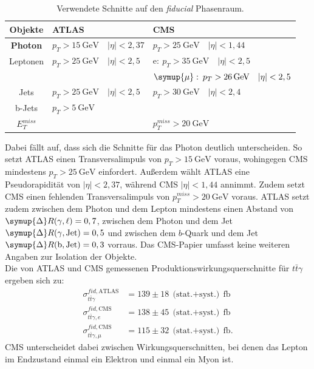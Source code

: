  \begin{table}[H]
     \centering
    \begin{tabular}{c|l|l}
      Objekte & ATLAS & CMS \\
      \hline
      \textbf{Photon} & $p_T > \SI{15}{\giga\electronvolt}\quad |\eta| < 2,37$ & $p_T > \SI{25}{\giga\electronvolt}\quad |\eta| < 1,44$\\
      Leptonen & $p_T > \SI{25}{\giga\electronvolt}\quad |\eta| < 2,5$ & $\text{e}:\: p_T > \SI{35}{\giga\electronvolt}\quad |\eta| < 2,5$ \\
      {} & {} & $\symup{\mu}:\: p_T > \SI{26}{\giga\electronvolt}\quad |\eta| < 2,5$\\
      Jets & $p_T > \SI{25}{\giga\electronvolt}\quad |\eta| < 2,5$ & $p_T > \SI{30}{\giga\electronvolt}\quad |\eta| < 2,4$\\
      b-Jets & $p_T > \SI{5}{\giga\electronvolt}$ &  \\
      $E^{miss}_T$ &  & $p_T^{miss} > \SI{20}{\giga\electronvolt}$
    \end{tabular}
    \caption{Verwendete Schnitte auf den \textit{fiducial} Phasenraum.}
    \label{tab:cut}
 \end{table}
Dabei fällt auf, dass sich die Schnitte für das Photon deutlich unterscheiden. So setzt ATLAS einen Transversalimpuls von $p_{T} > \SI{15}{\giga\electronvolt}$ voraus, wohingegen CMS mindestens $p_{T} > \SI{25}{\giga\electronvolt}$ einfordert. Außerdem wählt ATLAS eine Pseudorapidität von $|\eta| < 2,37$, während CMS $|\eta| < 1,44$ annimmt. Zudem setzt CMS einen fehlenden Transversalimpuls von $p_{T}^{miss} > \SI{20}{\giga\electronvolt}$ voraus.
ATLAS setzt zudem zwischen dem Photon und dem Lepton mindestens einen Abstand von $\symup{\Delta} R(\gamma, \ell) = 0,7$, zwischen dem Photon und dem Jet $\symup{\Delta} R(\gamma, \text{Jet}) = 0,5$ und zwischen dem $b$-Quark und dem Jet $\symup{\Delta} R(\text{b}, \text{Jet}) = 0,3$ vorraus.
Das CMS-Papier umfasst keine weiteren Angaben zur Isolation der Objekte.\\
Die von ATLAS und CMS gemessenen Produktionswirkungsquerschnitte für $t\bar{t}\gamma$ ergeben sich zu:
\begin{align*}
  \sigma^{fid, \text{ATLAS}}_{t\bar{t}\gamma} &= 139 \pm 18~\text{(stat.$+$syst.)}~ \si{\femto\barn}\\
  \sigma^{fid, \text{CMS}}_{t\bar{t}\gamma, e} &= 138 \pm 45~\text{(stat.$+$syst.)}~ \si{\femto\barn}\\
  \sigma^{fid, \text{CMS}}_{t\bar{t}\gamma, \mu} &= 115 \pm 32~\text{(stat.$+$syst.)}~ \si{\femto\barn}.
\end{align*}
CMS unterscheidet dabei zwischen Wirkungsquerschnitten, bei denen das Lepton im Endzustand einmal ein Elektron und einmal ein Myon ist.

